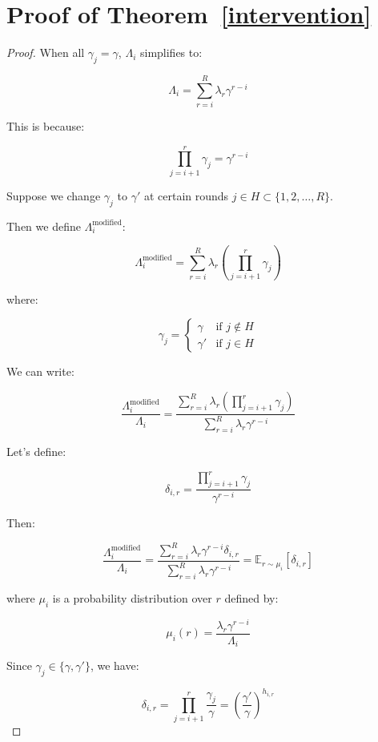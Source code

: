 \section{Proof of Theorem~\ref{intervention}}\label{appendix:intervention}

\begin{proof}

When all \( \gamma_j = \gamma \), \( \Lambda_i \) simplifies to:

\[
\Lambda_i = \sum_{r=i}^{R} \lambda_r \gamma^{r - i}
\]

This is because:

\[
\prod_{j=i+1}^{r} \gamma_j = \gamma^{r - i}
\]


Suppose we change \( \gamma_j \) to \( \gamma' \) at certain rounds \( j \in H \subset \{1, 2, \dots, R\} \).

Then we define \(\Lambda_i^{\text{modified}}\):

\[
\Lambda_i^{\text{modified}} = \sum_{r=i}^{R} \lambda_r \left( \prod_{j=i+1}^{r} \gamma_j \right)
\]

where:

\[
\gamma_j =
\begin{cases}
\gamma & \text{if } j \notin H \\
\gamma' & \text{if } j \in H
\end{cases}
\]


We can write:

\[
\frac{\Lambda_i^{\text{modified}}}{\Lambda_i} = \frac{\sum_{r=i}^{R} \lambda_r \left( \prod_{j=i+1}^{r} \gamma_j \right)}{\sum_{r=i}^{R} \lambda_r \gamma^{r - i}}
\]

Let’s define:

\[
\delta_{i,r} = \frac{\prod_{j=i+1}^{r} \gamma_j}{\gamma^{r - i}}
\]

Then:

\[
\frac{\Lambda_i^{\text{modified}}}{\Lambda_i} = \frac{\sum_{r=i}^{R} \lambda_r \gamma^{r - i} \delta_{i,r}}{\sum_{r=i}^{R} \lambda_r \gamma^{r - i}} = \mathbb{E}_{r \sim \mu_i} [ \delta_{i,r} ]
\]

where \( \mu_i \) is a probability distribution over \( r \) defined by:

\[
\mu_i(r) = \frac{\lambda_r \gamma^{r - i}}{\Lambda_i}
\]

Since \( \gamma_j \in \{\gamma, \gamma'\} \), we have:

\[
\delta_{i,r} = \prod_{j=i+1}^{r} \frac{\gamma_j}{\gamma} = \left( \frac{\gamma'}{\gamma} \right)^{h_{i,r}}
\]


\end{proof}
